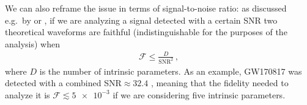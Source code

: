 \documentclass[main.tex]{subfiles}
\begin{document}
We can also reframe the issue in terms of signal-to-noise ratio: as discussed e.g.\ by \textcite[]{lindblomModelWaveformAccuracy2008} or \textcite[]{gambaFastFaithfulFrequencydomain2020}, if we are analyzing a signal detected with a certain \ac{SNR} two theoretical waveforms are faithful (indistinguishable for the purposes of the analysis) when 
%
\begin{align}
\mathcal{F} \leq \frac{D}{\text{SNR}^2}
\,,
\end{align}
%
where \(D\) is the number of intrinsic parameters. 
As an example, GW170817 was detected with a combined SNR\(\approx 32.4\) \cite[]{abbottGW170817ObservationGravitational2017}, meaning that the fidelity needed to analyze it is \(\mathcal{F} \lesssim \num{5e-3}\) if we are considering five intrinsic parameters.
\end{document}
